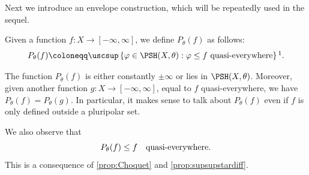 Next we introduce an envelope construction, which will be repeatedly used in the sequel.
\begin{definition}\label{def:Pthetaf}
    Given a function $f\colon X\rightarrow [-\infty,\infty]$, we define $P_{\theta}(f)$ as follows:
    \begin{equation}\label{eq:Pthetafdef}
    P_{\theta}(f)\coloneqq \uscsup \left\{ \varphi\in \PSH(X,\theta): \varphi\leq f\textup{ quasi-everywhere} \right\}\footnotemark.
    \end{equation}
\end{definition}
The function $P_{\theta}(f)$ is either constantly $\pm\infty$ or lies in $\PSH(X,\theta)$. Moreover, given another function $g\colon X\rightarrow [-\infty,\infty]$, equal to $f$ quasi-everywhere, we have $P_{\theta}(f)=P_{\theta}(g)$. In particular, it makes sense to talk about $P_{\theta}(f)$ even if $f$ is only defined outside a pluripolar set.

We also observe that
\begin{equation}\label{eq:Pthetafleqfqe}
P_{\theta}(f)\leq f\quad\textup{quasi-everywhere}.
\end{equation}
This is a consequence of \cref{prop:Choquet} and \cref{prop:supsupstardiff}.





